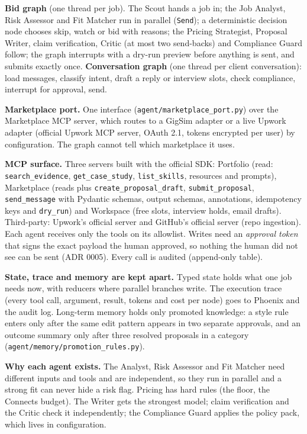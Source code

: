 \documentclass[10pt,a4paper]{article}
\newcommand{\file}[1]{\texttt{\small #1}}
\begin{document}
\textbf{Bid graph} (one thread per job). The Scout hands a job in; the Job Analyst, Risk Assessor and Fit Matcher run
in parallel (\texttt{Send}); a deterministic decision node chooses skip, watch or bid with reasons; the Pricing
Strategist, Proposal Writer, claim verification, Critic (at most two send-backs) and Compliance Guard follow; the
graph interrupts with a dry-run preview before anything is sent, and submits exactly once. \textbf{Conversation graph}
(one thread per client conversation): load messages, classify intent, draft a reply or interview slots, check
compliance, interrupt for approval, send.

\textbf{Marketplace port.} One interface (\file{agent/marketplace\_port.py}) over the Marketplace MCP server, which
routes to a GigSim adapter or a live Upwork adapter (official Upwork MCP server, OAuth 2.1, tokens encrypted per
user) by configuration. The graph cannot tell which marketplace it uses.

\textbf{MCP surface.} Three servers built with the official SDK: Portfolio (read: \texttt{search\_evidence},
\texttt{get\_case\_study}, \texttt{list\_skills}, resources and prompts), Marketplace (reads plus
\texttt{create\_proposal\_draft}, \texttt{submit\_proposal}, \texttt{send\_message} with Pydantic schemas, output
schemas, annotations, idempotency keys and \texttt{dry\_run}) and Workspace (free slots, interview holds, email
drafts). Third-party: Upwork's official server and GitHub's official server (repo ingestion). Each agent receives
only the tools on its allowlist. Writes need an \emph{approval token} that signs the exact payload the human approved,
so nothing the human did not see can be sent (ADR 0005). Every call is audited (append-only table).

\textbf{State, trace and memory are kept apart.} Typed state holds what one job needs now, with reducers where
parallel branches write. The execution trace (every tool call, argument, result, tokens and cost per node) goes to
Phoenix and the audit log. Long-term memory holds only promoted knowledge: a style rule enters only after the same
edit pattern appears in two separate approvals, and an outcome summary only after three resolved proposals in a
category (\file{agent/memory/promotion\_rules.py}).

\textbf{Why each agent exists.} The Analyst, Risk Assessor and Fit Matcher need different inputs and tools and are
independent, so they run in parallel and a strong fit can never hide a risk flag. Pricing has hard rules (the floor,
the Connects budget). The Writer gets the strongest model; claim verification and the Critic check it
independently; the Compliance Guard applies the policy pack, which lives in configuration.
\end{document}

